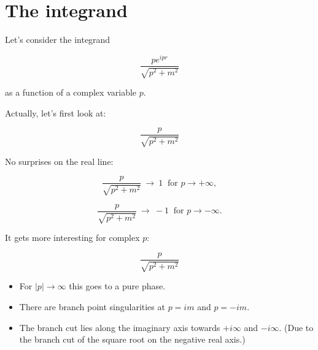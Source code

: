 \documentclass[aspectratio=169]{beamer}
\newcommand{\sqrtpm}{\sqrt{p^2 + m^2}}
\newcommand{\envelope}{\frac{p}{\sqrtpm}}
\newcommand{\integrand}{\frac{p e^{ipr}}{\sqrt{p^2 + m^2}}}
\begin{document}
\section{The integrand}

\begin{frame}
Let's consider the integrand

$$\integrand$$

as a function of a \alert{complex} variable $p$.

\end{frame}


\begin{frame}
Actually, let's first look at:

$$\envelope$$

\pause
No surprises on the real line:

\pause
$$\envelope \ \rightarrow \ 1 \ \textrm{ for } p \rightarrow +\infty,$$

$$\envelope \ \rightarrow \ -1 \ \textrm{ for } p \rightarrow -\infty.$$

\end{frame}




\begin{frame}
It gets more interesting for complex $p$:

$$\envelope$$

\begin{itemize}

\pause
\item For $|p| \rightarrow \infty$ this goes to  a pure phase.

\pause
\item There are branch point \alert{singularities} at $p = im$ and $p = -im$.

\pause
\item The \alert{branch cut} lies along the imaginary axis towards $+i\infty$ and $-i\infty$.
(Due to the branch cut of the square root on the negative real axis.)
\end{itemize}
\end{frame}
\end{document}
